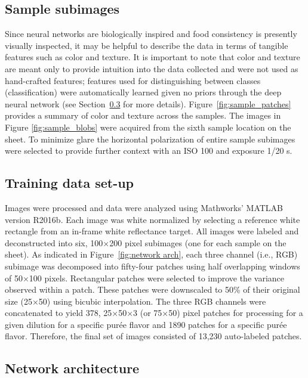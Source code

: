 \documentclass[authoryear]{elsarticle}
\begin{document}
\subsection{Sample subimages}\label{ssec:Sample subimages}
Since neural networks are biologically inspired and food consistency is presently visually inspected, it may be helpful to describe the data in terms of tangible features such as color and texture. It is important to note that color and texture are meant only to provide intuition into the data collected and were not used as hand-crafted features; features used for distinguishing between classes (classification) were automatically learned given no priors through the deep neural network (see Section~\ref{ssec:Network arch} for more details). Figure~\ref{fig:sample_patches} provides a summary of color and texture across the samples. The images in Figure \ref{fig:sample_blobs} were acquired from the sixth sample location on the sheet. To minimize glare the horizontal polarization of entire sample subimages were selected to provide further context with an ISO 100 and exposure 1/20 s.

\subsection{Training data set-up}\label{ssec:Training data}
Images were processed and data were analyzed using Mathworks’ MATLAB version R2016b. Each image was white normalized by selecting a reference white rectangle from an in-frame white reflectance target. All images were labeled and deconstructed into six, 100$\times$200 pixel subimages (one for each sample on the sheet). As indicated in Figure~\ref{fig:network arch}, each three channel (i.e., RGB) subimage was decomposed into fifty-four patches using half overlapping windows of 50$\times$100 pixels. Rectangular patches were selected to improve the variance observed within a patch. These patches were downscaled to 50\% of their original size (25$\times$50) using bicubic interpolation. The three RGB channels were concatenated to yield 378, 25$\times$50$\times$3 (or 75$\times$50) pixel patches for processing for a given dilution for a specific pur\' ee flavor and 1890 patches for a specific pur\' ee flavor. Therefore, the final set of images consisted of 13,230 auto-labeled patches.

\subsection{Network architecture}\label{ssec:Network arch}
\end{document}
